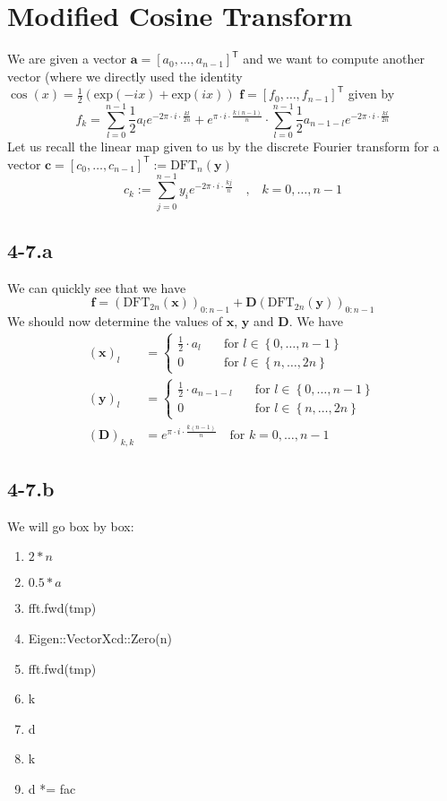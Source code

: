 \documentclass{article}
\begin{document}
\section*{Modified Cosine Transform}
We are given a vector $\mathbf{a} = \left[a_{0},\dots,a_{n-1}\right]^{\mathsf{T}}$ and we want to compute another vector (where we directly used the identity $\cos\left(x\right) = \frac{1}{2}\left(\text{exp}\left(-ix\right) + \text{exp}\left(ix\right)\right)$  $\mathbf{f} = \left[f_{0},\dots,f_{n-1}\right]^{\mathsf{T}}$ given by
\begin{equation*}
    f_{k} = \sum_{l=0}^{n-1}\frac{1}{2}a_{l}e^{-2\pi \cdot i \cdot \frac{kl}{2n}} + e^{\pi \cdot i\cdot \frac{k\left(n-1\right)}{n}} \cdot \sum_{l=0}^{n-1}\frac{1}{2}a_{n-1-l}e^{-2\pi \cdot i\cdot \frac{kl}{2n}}
\end{equation*}
Let us recall the linear map given to us by the discrete Fourier transform for a vector $\mathbf{c} = \left[c_{0},\dots,c_{n-1}\right]^{\mathsf{T}} := \text{DFT}_{n}\left(\mathbf{y}\right)$
\begin{equation*}
    c_{k} := \sum_{j=0}^{n-1}y_{i}e^{-2\pi \cdot i\cdot \frac{kj}{n}} \quad \text{,} \quad k = 0,\dots ,n-1
\end{equation*}
\subsection*{4-7.a} We can quickly see that we have
\begin{equation*}
    \mathbf{f} = \left(\text{DFT}_{2n}\left(\mathbf{x}\right)\right)_{0:n-1} + \mathbf{D}\left(\text{DFT}_{2n}\left(\mathbf{y}\right)\right)_{0:n-1}
\end{equation*}
We should now determine the values of $\mathbf{x}$, $\mathbf{y}$ and $\mathbf{D}$. We have
\begin{align*}
    \left(\mathbf{x}\right)_{l} &= \begin{cases}
        \frac{1}{2} \cdot a_{l} \quad&\text{for } l \in \left\{0, \dots, n-1\right\}
        \\
        0\quad&\text{for } l \in \left\{n, \dots, 2n\right\}
    \end{cases} \\
\left(\mathbf{y}\right)_{l} &= \begin{cases}
        \frac{1}{2} \cdot a_{n- 1 -l} \quad&\text{for } l \in \left\{0, \dots, n-1\right\}
        \\
        0\quad&\text{for } l \in \left\{n, \dots, 2n\right\}
    \end{cases}
    \\[1mm]
    \left(\mathbf{D}\right)_{k,k} &= e^{\pi \cdot i \cdot \frac{k\left(n-1\right)}{n}} \quad \text{for } k = 0, \dots, n-1
\end{align*}
\subsection*{4-7.b}
We will go box by box:
\begin{enumerate}
    \item $2 * n$
    \item $0.5 * a$
    \item fft.fwd(tmp)
    \item Eigen::VectorXcd::Zero(n)
    \item fft.fwd(tmp)
    \item k
    \item d
    \item k
    \item d *= fac
\end{enumerate}
\end{document}
